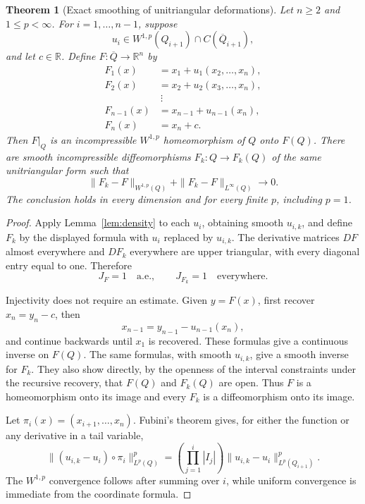 \documentclass[11pt]{article}
\newtheorem{theorem}{Theorem}
\theoremstyle{remark}
\newcommand{\R}{\mathbb{R}}
\begin{document}
\begin{theorem}[Exact smoothing of unitriangular deformations]
\label{thm:triangular}
Let $n\geq2$ and $1\leq p<\infty$.  For $i=1,\ldots,n-1$, suppose
\[
 u_i\in W^{1,p}(Q_{i+1})\cap C(\overline{Q}_{i+1}),
\]
and let $c\in\R$.  Define $F:\overline Q\to\R^n$ by
\[
 \begin{aligned}
 F_1(x)&=x_1+u_1(x_2,\ldots,x_n),\\
 F_2(x)&=x_2+u_2(x_3,\ldots,x_n),\\
 &\ \vdots\\
 F_{n-1}(x)&=x_{n-1}+u_{n-1}(x_n),\\
 F_n(x)&=x_n+c.
 \end{aligned}
\]
Then $F|_Q$ is an incompressible $W^{1,p}$ homeomorphism of $Q$ onto
$F(Q)$.  There are smooth incompressible diffeomorphisms
$F_k:Q\to F_k(Q)$ of the same unitriangular form such that
\[
 \|F_k-F\|_{W^{1,p}(Q)}+\|F_k-F\|_{L^\infty(Q)}\longrightarrow0.
\]
The conclusion holds in every dimension and for every finite $p$, including
$p=1$.
\end{theorem}

\begin{proof}
Apply Lemma~\ref{lem:density} to each $u_i$, obtaining smooth $u_{i,k}$, and
define $F_k$ by the displayed formula with $u_i$ replaced by $u_{i,k}$.
The derivative matrices $DF$ almost everywhere and $DF_k$ everywhere are
upper triangular, with every diagonal entry equal to one.  Therefore
\[
 J_F=1\quad\text{a.e.},\qquad J_{F_k}=1\quad\text{everywhere}.
\]

Injectivity does not require an estimate.  Given $y=F(x)$, first recover
$x_n=y_n-c$, then
\[
 x_{n-1}=y_{n-1}-u_{n-1}(x_n),
\]
and continue backwards until $x_1$ is recovered.  These formulas give a
continuous inverse on $F(Q)$.  The same formulas, with smooth $u_{i,k}$,
give a smooth inverse for $F_k$.  They also show directly, by the openness
of the interval constraints under the recursive recovery, that $F(Q)$ and
$F_k(Q)$ are open.  Thus $F$ is a homeomorphism onto its image and every
$F_k$ is a diffeomorphism onto its image.

Let $\pi_i(x)=(x_{i+1},\ldots,x_n)$.  Fubini's theorem gives, for either the
function or any derivative in a tail variable,
\[
 \| (u_{i,k}-u_i)\circ\pi_i\|_{L^p(Q)}^p
 =\left(\prod_{j=1}^{i}|I_j|\right)
   \|u_{i,k}-u_i\|_{L^p(Q_{i+1})}^p.
\]
The $W^{1,p}$ convergence follows after summing over $i$, while uniform
convergence is immediate from the coordinate formula.
\end{proof}
\end{document}

